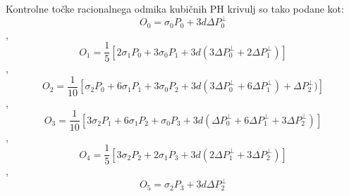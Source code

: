 \documentclass[12pt]{article}
\begin{document}
Kontrolne točke racionalnega odmika kubičnih PH krivulj so tako podane kot:
$$ O_0 = \sigma_0 P_0 + 3 d \Delta P_0^{\perp}$$,
$$ O_1 = \frac{1}{5} [2 \sigma_1 P_0 + 3\sigma_0 P_1 + 3 d (3 \Delta P_0^{\perp} + 2 \Delta P_1^{\perp})]$$,
$$ O_2 = \frac{1}{10} [\sigma_2 P_0 + 6\sigma_1 P_1 + 3\sigma_0 P_2 + 3 d (3 \Delta P_0^{\perp} + 6 \Delta P_1^{\perp}) + \Delta P_2^{\perp})]$$,
$$ O_3 = \frac{1}{10} [3\sigma_2 P_1 + 6\sigma_1 P_2 + \sigma_0 P_3 + 3 d (\Delta P_0^{\perp} + 6 \Delta P_1^{\perp} + 3 \Delta P_2^{\perp})]$$,
$$ O_4 = \frac{1}{5} [3\sigma_2 P_2 + 2\sigma_1 P_3 + 3 d (2\Delta P_1^{\perp} + 3 \Delta P_2^{\perp})]$$,
$$ O_5 = \sigma_2 P_3 + 3 d \Delta P_2^{\perp}$$
\end{document}
